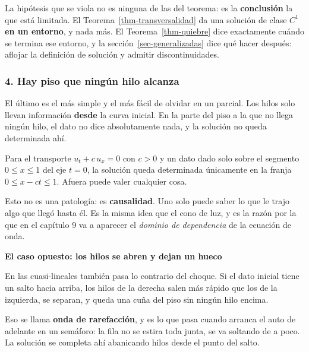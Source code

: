 \documentclass[
  spanish,
  a4paper,
]{scrbook}
\theoremstyle{definition}
\theoremstyle{plain}
\theoremstyle{definition}
\theoremstyle{plain}
\theoremstyle{definition}
\theoremstyle{remark}
\begin{document}
La hipótesis que se viola no es ninguna de las del teorema: es la
\textbf{conclusión} la que está limitada. El
Teorema~\ref{thm-transversalidad} da una solución de clase \(C^1\)
\textbf{en un entorno}, y nada más. El Teorema~\ref{thm-quiebre} dice
exactamente cuándo se termina ese entorno, y la
sección~\ref{sec-generalizadas} dice qué hacer después: aflojar la
definición de solución y admitir discontinuidades.

\subsubsection{4. Hay piso que ningún hilo
alcanza}\label{sec-patologia-hueco}

El último es el más simple y el más fácil de olvidar en un parcial. Los
hilos solo llevan información \textbf{desde} la curva inicial. En la
parte del piso a la que no llega ningún hilo, el dato no dice
absolutamente nada, y la solución no queda determinada ahí.

Para el transporte \(u_t + c\,u_x = 0\) con \(c>0\) y un dato dado solo
sobre el segmento \(0 \le x \le 1\) del eje \(t=0\), la solución queda
determinada únicamente en la franja \(0 \le x - ct \le 1\). Afuera puede
valer cualquier cosa.

Esto no es una patología: es \textbf{causalidad}. Uno solo puede saber
lo que le trajo algo que llegó hasta él. Es la misma idea que el cono de
luz, y es la razón por la que en el capítulo 9 va a aparecer el
\emph{dominio de dependencia} de la ecuación de onda.

\begin{tcolorbox}[enhanced jigsaw, arc=.35mm, bottomrule=.15mm, breakable, colback=white, colframe=quarto-callout-tip-color-frame, left=2mm, leftrule=.75mm, opacityback=0, rightrule=.15mm, toprule=.15mm]
\begin{minipage}[t]{5.5mm}
\textcolor{quarto-callout-tip-color}{\faLightbulb}
\end{minipage}%
\begin{minipage}[t]{\textwidth - 5.5mm}

\vspace{-3mm}\textbf{El caso opuesto: los hilos se abren y dejan un hueco}\vspace{3mm}

En las cuasi-lineales también pasa lo contrario del choque. Si el dato
inicial tiene un salto hacia arriba, los hilos de la derecha salen más
rápido que los de la izquierda, se separan, y queda una cuña del piso
sin ningún hilo encima.

Eso se llama \textbf{onda de rarefacción}, y es lo que pasa cuando
arranca el auto de adelante en un semáforo: la fila no se estira toda
junta, se va soltando de a poco. La solución se completa ahí abanicando
hilos desde el punto del salto.

\end{minipage}%
\end{tcolorbox}
\end{document}

